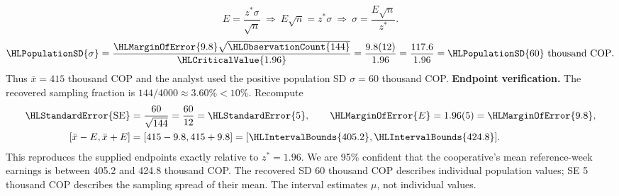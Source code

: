 \[E=\frac{z^*\sigma}{\sqrt n}\ \Longrightarrow\ E\sqrt n=z^*\sigma\ \Longrightarrow\ \sigma=\frac{E\sqrt n}{z^*}.\]
\[\HLPopulationSD{\sigma}=\frac{\HLMarginOfError{9.8}\sqrt{\HLObservationCount{144}}}{\HLCriticalValue{1.96}}=\frac{9.8(12)}{1.96}=\frac{117.6}{1.96}=\HLPopulationSD{60}\text{ thousand COP}.\]
Thus $\bar x=415$ thousand COP and the analyst used the positive population SD $\sigma=60$ thousand COP.
\textbf{Endpoint verification.} The recovered sampling fraction is $144/4000\approx 3.60\%<10\%$. Recompute
\[\begin{aligned}
\HLStandardError{\mathrm{SE}}&=\frac{60}{\sqrt{144}}=\frac{60}{12}=\HLStandardError{5},\qquad \HLMarginOfError{E}=1.96(5)=\HLMarginOfError{9.8},\\
[\bar x-E,\bar x+E]&=[415-9.8,415+9.8]=[\HLIntervalBounds{405.2},\HLIntervalBounds{424.8}].
\end{aligned}\]
This reproduces the supplied endpoints exactly relative to $z^*=1.96$. We are 95\% confident that the cooperative's mean reference-week earnings is between 405.2 and 424.8 thousand COP.
The recovered SD 60 thousand COP describes individual population values; SE 5 thousand COP describes the sampling spread of their mean. The interval estimates $\mu$, not individual values.
\clearpage
